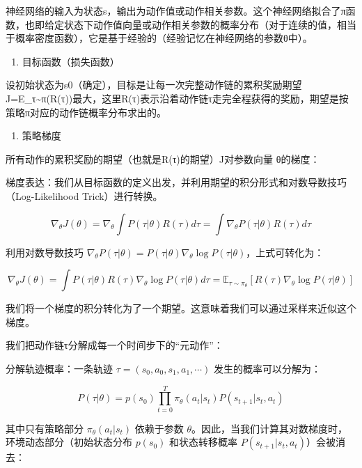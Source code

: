 神经网络的输入为状态s，输出为动作值或动作相关参数。这个神经网络拟合了π函数，也即给定状态下动作值向量或动作相关参数的概率分布（对于连续的值，相当于概率密度函数），它是基于经验的（经验记忆在神经网络的参数θ中）。

\begin{enumerate}
\def\labelenumi{\arabic{enumi}.}
\setcounter{enumi}{2}
\tightlist
\item
  目标函数（损失函数）
\end{enumerate}

设初始状态为s0（确定），目标是让每一次完整动作链的累积奖励期望J=E\_τ\textasciitilde π(R(τ))最大，这里R(τ)表示沿着动作链τ走完全程获得的奖励，期望是按策略π对应的动作链概率分布求出的。

\begin{enumerate}
\def\labelenumi{\arabic{enumi}.}
\setcounter{enumi}{3}
\tightlist
\item
  策略梯度
\end{enumerate}

所有动作的累积奖励的期望（也就是R(τ)的期望）J对参数向量 θ的梯度：

梯度表达：我们从目标函数的定义出发，并利用期望的积分形式和对数导数技巧（Log-Likelihood Trick）进行转换。

\[
\nabla_\theta J(\theta)
=\nabla_\theta\int P(\tau|\theta)R(\tau)d\tau
=\int\nabla_\theta P(\tau|\theta)R(\tau)d\tau
\]

利用对数导数技巧 \(\nabla_\theta P(\tau|\theta)=P(\tau|\theta)\nabla_\theta\log P(\tau|\theta)\)，上式可转化为：

\[
\nabla_\theta J(\theta)
=\int P(\tau|\theta)R(\tau)\nabla_\theta\log P(\tau|\theta)d\tau
=\mathbb{E}_{\tau\sim\pi_\theta}\left[R(\tau)\nabla_\theta\log P(\tau|\theta)\right]
\]

我们将一个梯度的积分转化为了一个期望。这意味着我们可以通过采样来近似这个梯度。

我们把动作链τ分解成每一个时间步下的``元动作''：

分解轨迹概率：一条轨迹 \(\tau=(s_0,a_0,s_1,a_1,\cdots)\) 发生的概率可以分解为：

\[
P(\tau|\theta)=p(s_0)\prod_{t=0}^{T}\pi_\theta(a_t|s_t)P(s_{t+1}|s_t,a_t)
\]

其中只有策略部分 \(\pi_\theta(a_t|s_t)\) 依赖于参数 \(\theta\)。因此，当我们计算其对数梯度时，环境动态部分（初始状态分布 \(p(s_0)\) 和状态转移概率 \(P(s_{t+1}|s_t,a_t)\)）会被消去：

